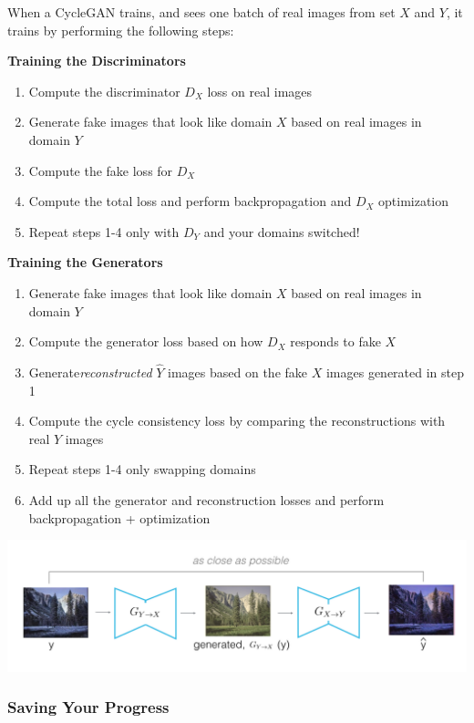 When a CycleGAN trains, and sees one batch of real images from set \(X\)
and \(Y\), it trains by performing the following steps:

\textbf{Training the Discriminators} 
\begin{enumerate}
    \item Compute the discriminator \(D_X\) loss on real images
    \item Generate fake images that look like domain \(X\) based on real images in domain \(Y\)
    \item Compute the fake loss for \(D_X\)
    \item Compute the total loss and perform backpropagation and \(D_X\) optimization
    \item Repeat steps 1-4 only with \(D_Y\) and your domains switched!
\end{enumerate}

\textbf{Training the Generators} 
\begin{enumerate}
    \item Generate fake images that look like domain \(X\) based on real images in domain \(Y\)
    \item Compute the generator loss based on how \(D_X\) responds to fake \(X\)
    \item Generate\emph{reconstructed} \(\hat{Y}\) images based on the fake \(X\) images generated in step 1
    \item Compute the cycle consistency loss by comparing the reconstructions with real \(Y\) images
    \item Repeat steps 1-4 only swapping domains
    \item Add up all the generator and reconstruction losses and perform backpropagation + optimization
\end{enumerate}

\includegraphics[width=1\linewidth]{img//genAdvNet//image2image/cycle_consistency_ex.png}

\subsubsection{Saving Your Progress}

